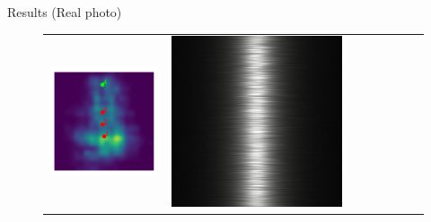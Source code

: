 \documentclass[final]{beamer}
\newlength{\twocolwid}
\newlength{\resultwidth}
\begin{document}
\begin{frame}[t]
\begin{columns}[t]
\begin{column}{\twocolwid}
\begin{block}{Results (Real photo)}
\begin{figure}[t]
\begin{tabular}{ccrclccc}
            		\includegraphics[width=\resultwidth]{images/real/metal/posterior.pdf} &
            		\includegraphics[width=\resultwidth]{images/real/metal/good1.jpg} &

\end{tabular}
\end{figure}
\end{block}
\end{column}
\end{columns}
\end{frame}
\end{document}
